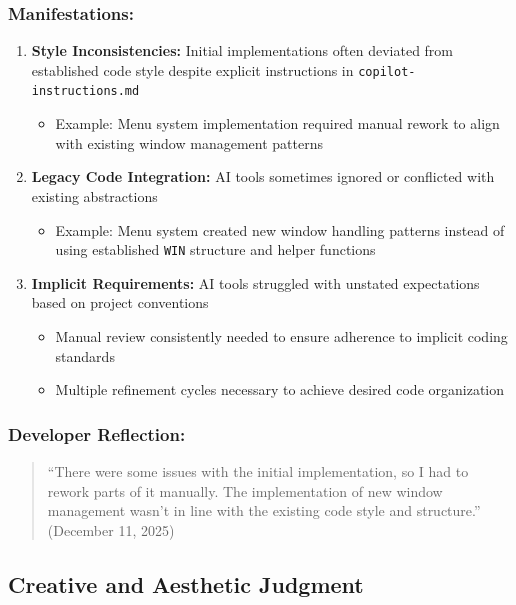 \documentclass[12pt,a4paper]{article}
\begin{document}
\subsubsection*{Manifestations:}
\begin{enumerate}
    \item \textbf{Style Inconsistencies:} Initial implementations often deviated from established code style despite explicit instructions in \texttt{copilot-instructions.md}
    \begin{itemize}
        \item Example: Menu system implementation required manual rework to align with existing window management patterns
    \end{itemize}
    
    \item \textbf{Legacy Code Integration:} AI tools sometimes ignored or conflicted with existing abstractions
    \begin{itemize}
        \item Example: Menu system created new window handling patterns instead of using established \texttt{WIN} structure and helper functions
    \end{itemize}
    
    \item \textbf{Implicit Requirements:} AI tools struggled with unstated expectations based on project conventions
    \begin{itemize}
        \item Manual review consistently needed to ensure adherence to implicit coding standards
        \item Multiple refinement cycles necessary to achieve desired code organization
    \end{itemize}
\end{enumerate}

\subsubsection*{Developer Reflection:}
\begin{quote}
``There were some issues with the initial implementation, so I had to rework parts of it manually. The implementation of new window management wasn't in line with the existing code style and structure.'' (December 11, 2025)
\end{quote}

\subsection{Creative and Aesthetic Judgment}
\end{document}
